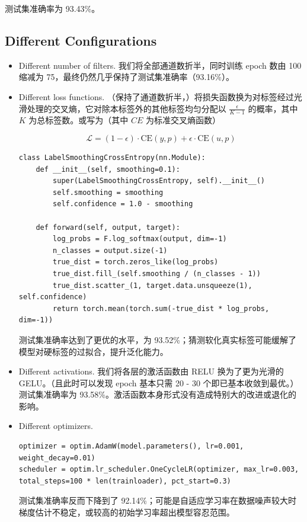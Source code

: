 \documentclass[10pt]{ctexart}
\begin{document}
测试集准确率为 93.43\%。

\subsection{Different Configurations}
\begin{itemize}
	\item Different number of filters. 我们将全部通道数折半，同时训练 epoch 数由 100 缩减为 75，最终仍然几乎保持了测试集准确率（93.16\%）。
	
	\item Different loss functions. （保持了通道数折半，）将损失函数换为对标签经过光滑处理的交叉熵，它对除本标签外的其他标签均匀分配以 $\frac{\epsilon}{K-1}$ 的概率，其中 $K$ 为总标签数。或写为（其中 $CE$ 为标准交叉熵函数）
	
	$$
	\mathcal{L}=(1-\epsilon) \cdot \mathrm{CE}(y, p)+\epsilon \cdot \mathrm{CE}(u, p)
	$$
	
\begin{lstlisting}
class LabelSmoothingCrossEntropy(nn.Module):
	def __init__(self, smoothing=0.1):
		super(LabelSmoothingCrossEntropy, self).__init__()
		self.smoothing = smoothing
		self.confidence = 1.0 - smoothing
		
	def forward(self, output, target):
		log_probs = F.log_softmax(output, dim=-1)
		n_classes = output.size(-1)
		true_dist = torch.zeros_like(log_probs)
		true_dist.fill_(self.smoothing / (n_classes - 1))
		true_dist.scatter_(1, target.data.unsqueeze(1), self.confidence)
		return torch.mean(torch.sum(-true_dist * log_probs, dim=-1))
\end{lstlisting}
	
	测试集准确率达到了更优的水平，为 93.52\%；猜测软化真实标签可能缓解了模型对硬标签的过拟合，提升泛化能力。
	
	\item Different activations. 我们将各层的激活函数由 RELU 换为了更为光滑的 GELU。（且此时可以发现 epoch 基本只需 20 - 30 个即已基本收敛到最优。）测试集准确率为 93.58\%。激活函数本身形式没有造成特别大的改进或退化的影响。
	
	\item Different optimizers. 
	
\begin{lstlisting}
optimizer = optim.AdamW(model.parameters(), lr=0.001, weight_decay=0.01)
scheduler = optim.lr_scheduler.OneCycleLR(optimizer, max_lr=0.003, total_steps=100 * len(trainloader), pct_start=0.3)
\end{lstlisting}
	
	测试集准确率反而下降到了 92.14\%；可能是自适应学习率在数据噪声较大时梯度估计不稳定，或较高的初始学习率超出模型容忍范围。
	
\end{itemize}
\end{document}
